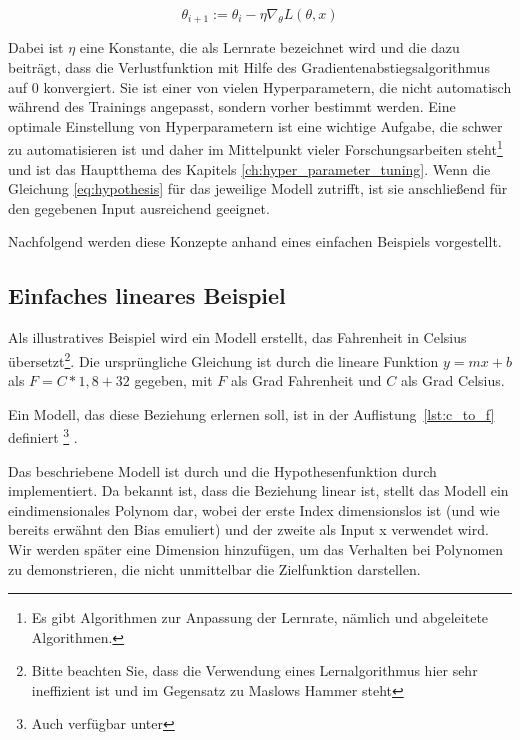 \begin{equation}
    \theta_{i+1} := \theta_i - \eta \nabla_\theta L(\theta, x)
    \label{eq:gradient_descent}
\end{equation}

Dabei ist $\eta$ eine Konstante, die als Lernrate bezeichnet wird und die dazu beiträgt, dass die Verlustfunktion mit Hilfe des Gradientenabstiegsalgorithmus auf 0 konvergiert.
Sie ist einer von vielen Hyperparametern, die nicht automatisch während des Trainings angepasst, sondern vorher bestimmt werden.
Eine optimale Einstellung von Hyperparametern ist eine wichtige Aufgabe, die schwer zu automatisieren ist und daher im Mittelpunkt vieler Forschungsarbeiten steht\footnote{Es gibt Algorithmen zur Anpassung der Lernrate, nämlich  \cite{Duchi2010} und abgeleitete Algorithmen.} und ist das Hauptthema des Kapitels \ref{ch:hyper_parameter_tuning}.
Wenn die Gleichung \eqref{eq:hypothesis} für das jeweilige Modell zutrifft, ist sie anschließend für den gegebenen Input ausreichend geeignet.

Nachfolgend werden diese Konzepte anhand eines einfachen Beispiels vorgestellt.

\subsection{Einfaches lineares Beispiel} \label{ch:simple_linear_example}

Als illustratives Beispiel wird ein Modell erstellt, das Fahrenheit in Celsius übersetzt\footnote{Bitte beachten Sie, dass die Verwendung eines Lernalgorithmus hier sehr ineffizient ist und im Gegensatz zu Maslows Hammer steht}.
Die ursprüngliche Gleichung ist durch die lineare Funktion $y = mx + b$ als $F = C * 1,8 + 32$ gegeben, mit $F$ als Grad Fahrenheit und $C$ als Grad Celsius.

Ein Modell, das diese Beziehung erlernen soll, ist in der Auflistung~\ref{lst:c_to_f} definiert \footnote{Auch verfügbar unter } .



Das beschriebene Modell ist durch  und die Hypothesenfunktion durch  implementiert.
Da bekannt ist, dass die Beziehung linear ist, stellt das Modell ein eindimensionales Polynom dar, wobei der erste Index dimensionslos ist (und wie bereits erwähnt den Bias emuliert) und der zweite als Input x verwendet wird.
Wir werden später eine Dimension hinzufügen, um das Verhalten bei Polynomen zu demonstrieren, die nicht unmittelbar die Zielfunktion darstellen.

